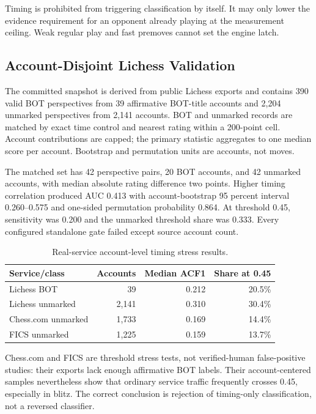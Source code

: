 \documentclass[conference]{IEEEtranSSP}
\begin{document}
Timing is prohibited from triggering classification by itself. It may only lower the evidence requirement for an opponent already playing at the measurement ceiling. Weak regular play and fast premoves cannot set the engine latch.

\subsection{Account-Disjoint Lichess Validation}
The committed snapshot is derived from public Lichess exports \cite{lichessdb} and contains 390 valid BOT perspectives from 39 affirmative BOT-title accounts and 2,204 unmarked perspectives from 2,141 accounts. BOT and unmarked records are matched by exact time control and nearest rating within a 200-point cell. Account contributions are capped; the primary statistic aggregates to one median score per account. Bootstrap and permutation units are accounts, not moves.

The matched set has 42 perspective pairs, 20 BOT accounts, and 42 unmarked accounts, with median absolute rating difference two points. Higher timing correlation produced AUC 0.413 with account-bootstrap 95 percent interval 0.260--0.575 and one-sided permutation probability 0.864. At threshold 0.45, sensitivity was 0.200 and the unmarked threshold share was 0.333. Every configured standalone gate failed except source account count.

\begin{table}[t]
\caption{Real-service account-level timing stress results.}
\label{tab:timing}
\centering
\footnotesize
\begin{tabular}{|p{}|r|r|r|}
\hline
Service/class & Accounts & Median ACF1 & Share at 0.45 \\
\hline
Lichess BOT & 39 & 0.212 & 20.5\% \\
Lichess unmarked & 2,141 & 0.310 & 30.4\% \\
Chess.com unmarked & 1,733 & 0.169 & 14.4\% \\
FICS unmarked & 1,225 & 0.159 & 13.7\% \\
\hline
\end{tabular}
\end{table}

Chess.com \cite{chesscomapi} and FICS \cite{fics} are threshold stress tests, not verified-human false-positive studies: their exports lack enough affirmative BOT labels. Their account-centered samples nevertheless show that ordinary service traffic frequently crosses 0.45, especially in blitz. The correct conclusion is rejection of timing-only classification, not a reversed classifier.
\end{document}
